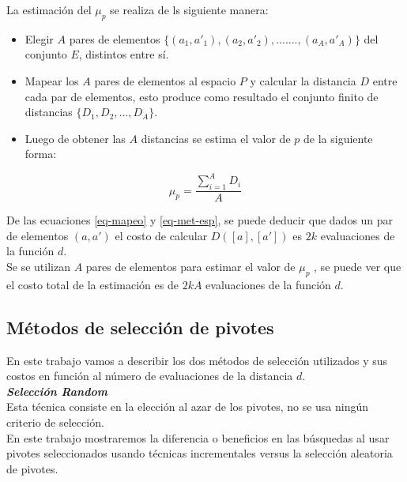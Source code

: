 \noindent La estimaci\'on del $\mu_p$ se realiza de ls siguiente manera:

\begin{itemize}

\item Elegir $A$ pares de elementos $\{(a_1,a'_1),(a_2,a'_2),.......,(a_A,a'_A)\}$ del conjunto $E$, distintos entre s\'i.

\item Mapear los $A$ pares de elementos al espacio $P$ y calcular la distancia $D$ entre cada par de elementos, esto produce como resultado el conjunto finito de distancias $\{D_1,D_2,...,D_A\}$.
  
\item Luego de obtener las $A$ distancias se estima el valor de $p$ de la siguiente forma:
\end{itemize}

\begin{equation}
\mu_p = \frac{\sum_{i=1}^A D_i}{A}
\end{equation}

De las ecuaciones \ref{eq-mapeo} y \ref{eq-met-esp}, se puede deducir que dados un par de elementos $(a,a')$ el costo de calcular $D([a],[a'])$ es $2k$ evaluaciones de la funci\'on $d$.\\

Se se utilizan $A$ pares de elementos para estimar el valor de $\mu_p$ , se puede ver que el costo total de la estimaci\'on es de $2kA$ evaluaciones de la funci\'on $d$.\\

\subsection{M\'etodos de selecci\'on de pivotes}

En este trabajo vamos a describir los dos m\'etodos de selecci\'on utilizados y sus costos en funci\'on al n\'umero de evaluaciones de la distancia $d$.\\

\noindent \textit{\textbf{Selecci\'on Random}}\\

Esta t\'ecnica consiste en la elecci\'on al azar de los pivotes, no se usa ning\'un criterio de selecci\'on.\\

En este trabajo mostraremos la diferencia o beneficios en las b\'usquedas al usar pivotes seleccionados usando t\'ecnicas incrementales versus la selecci\'on aleatoria de pivotes.\\

